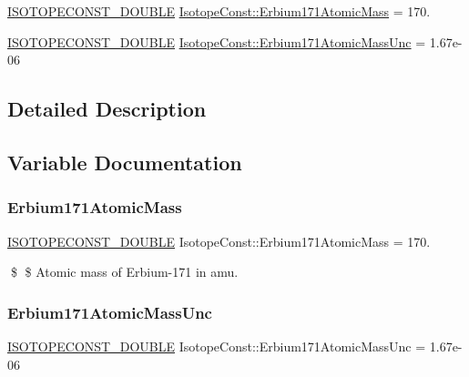 \begin{DoxyCompactItemize}
\item 
\mbox{\hyperlink{group___isotope_const-_macros_ga8f45a7272ce02c0b4c65c44636ed719a}{I\+S\+O\+T\+O\+P\+E\+C\+O\+N\+S\+T\+\_\+\+D\+O\+U\+B\+LE}} \mbox{\hyperlink{group___isotope_const-_erbium-_er171_ga25a3a8c7c19fc5f26ac028f88e538a48}{Isotope\+Const\+::\+Erbium171\+Atomic\+Mass}} = 170.
\item 
\mbox{\hyperlink{group___isotope_const-_macros_ga8f45a7272ce02c0b4c65c44636ed719a}{I\+S\+O\+T\+O\+P\+E\+C\+O\+N\+S\+T\+\_\+\+D\+O\+U\+B\+LE}} \mbox{\hyperlink{group___isotope_const-_erbium-_er171_ga5aeb334bf858bb38b5efd78993bf7e0c}{Isotope\+Const\+::\+Erbium171\+Atomic\+Mass\+Unc}} = 1.\+67e-\/06
\end{DoxyCompactItemize}


\subsection{Detailed Description}


\subsection{Variable Documentation}
\mbox{\label{group___isotope_const-_erbium-_er171_ga25a3a8c7c19fc5f26ac028f88e538a48}} 
\subsubsection{\texorpdfstring{Erbium171\+Atomic\+Mass}{Erbium171AtomicMass}}
{\footnotesize\ttfamily \mbox{\hyperlink{group___isotope_const-_macros_ga8f45a7272ce02c0b4c65c44636ed719a}{I\+S\+O\+T\+O\+P\+E\+C\+O\+N\+S\+T\+\_\+\+D\+O\+U\+B\+LE}} Isotope\+Const\+::\+Erbium171\+Atomic\+Mass = 170.}

\$ \$ Atomic mass of Erbium-\/171 in amu. \mbox{\label{group___isotope_const-_erbium-_er171_ga5aeb334bf858bb38b5efd78993bf7e0c}} 
\subsubsection{\texorpdfstring{Erbium171\+Atomic\+Mass\+Unc}{Erbium171AtomicMassUnc}}
{\footnotesize\ttfamily \mbox{\hyperlink{group___isotope_const-_macros_ga8f45a7272ce02c0b4c65c44636ed719a}{I\+S\+O\+T\+O\+P\+E\+C\+O\+N\+S\+T\+\_\+\+D\+O\+U\+B\+LE}} Isotope\+Const\+::\+Erbium171\+Atomic\+Mass\+Unc = 1.\+67e-\/06}

